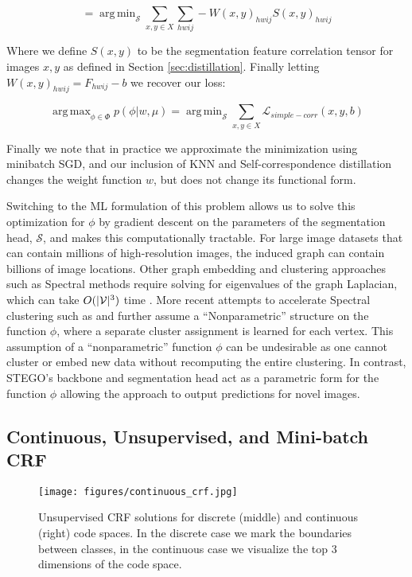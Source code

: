 \documentclass{article} \usepackage{iclr2022_conference,times}
\DeclareMathOperator*{\argmax}{arg\,max}
\DeclareMathOperator*{\argmin}{arg\,min}
\begin{document}
\begin{equation}
     = \argmin_{\mathcal{S}} \sum_{x,y \in X} \sum_{hwij} -W(x,y)_{hwij} S(x,y)_{hwij}
\end{equation}

Where we define $S(x,y)$ to be the segmentation feature correlation tensor for images $x,y$ as defined in Section \ref{sec:distillation}. Finally letting $W(x,y)_{hwij} = F_{hwij} - b$ we recover our loss:

\begin{equation}
     \argmax_{\phi \in \Phi} p(\phi | w, \mu )  = \argmin_{\mathcal{S}} \sum_{x,y \in X} \mathcal{L}_{\mathit{simple-corr}}(x,y,b)
\end{equation}

Finally we note that in practice we approximate the minimization using minibatch SGD, and our inclusion of KNN and Self-correspondence distillation changes the weight function $w$, but does not change its functional form. 

Switching to the ML formulation of this problem allows us to solve this optimization for $\phi$ by gradient descent on the parameters of the segmentation head, $\mathcal{S}$, and makes this computationally tractable. For large image datasets that can contain millions of high-resolution images, the induced graph can contain billions of image locations. Other graph embedding and clustering approaches such as Spectral methods require solving for eigenvalues of the graph Laplacian, which can take $O(|\mathcal{V}|^3)$ time \citep{yan2009fast}. More recent attempts to accelerate Spectral clustering such as \citep{yan2009fast} and \citep{han2017mini} further assume a ``Nonparametric'' structure on the function $\phi$, where a separate cluster assignment is learned for each vertex. This assumption of a ``nonparametric'' function $\phi$ can be undesirable as one cannot cluster or embed new data without recomputing the entire clustering. In contrast, STEGO's backbone and segmentation head act as a parametric form for the function $\phi$ allowing the approach to output predictions for novel images.

\subsection{Continuous, Unsupervised, and Mini-batch CRF}
\label{sec:crf}

\begin{figure}[h]
    \centering
    \texttt{[image: figures/continuous\_crf.jpg]}
    \caption{Unsupervised CRF solutions for discrete (middle) and continuous (right) code spaces. In the discrete case we mark the boundaries between classes, in the continuous case we visualize the top 3 dimensions of the code space.}
    \label{fig:crf}
\end{figure}
\end{document}
